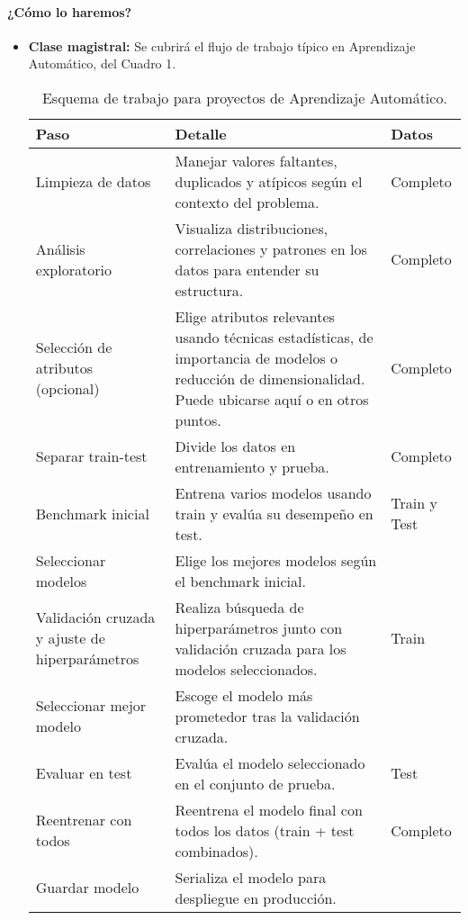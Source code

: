 \documentclass[a4,11pt]{aleph-notas}
\begin{document}
\paragraph{¿Cómo lo haremos?}  
\begin{itemize}[leftmargin=*]
    \item \textbf{Clase magistral:} Se cubrirá el flujo de trabajo típico en Aprendizaje Automático, del Cuadro 1.

    \begin{table}[h]
        \centering\small
        \begin{tabular}{p{4.5cm}p{8.5cm}l}
            \toprule
            \textbf{Paso} & \textbf{Detalle} & \textbf{Datos} \\ \midrule
            Limpieza de datos 
            & Manejar valores faltantes, duplicados y atípicos según el contexto del problema. 
            & Completo \\ \midrule
            Análisis exploratorio 
            & Visualiza distribuciones, correlaciones y patrones en los datos para entender su estructura. 
            & Completo \\ \midrule
            Selección de atributos (opcional) 
            & Elige atributos relevantes usando técnicas estadísticas, de importancia de modelos o reducción de dimensionalidad. Puede ubicarse aquí o en otros puntos. 
            & Completo \\ \midrule
            Separar train-test 
            & Divide los datos en entrenamiento y prueba. 
            & Completo \\ \midrule
            Benchmark inicial 
            & Entrena varios modelos usando train y evalúa su desempeño en test. 
            & Train y Test \\ \midrule
            Seleccionar modelos 
            & Elige los mejores modelos según el benchmark inicial. 
            &  \\ \midrule
            Validación cruzada y ajuste de hiperparámetros
            & Realiza búsqueda de hiperparámetros junto con validación cruzada para los modelos seleccionados. 
            & Train \\ \midrule
            Seleccionar mejor modelo 
            & Escoge el modelo más prometedor tras la validación cruzada. 
            &  \\ \midrule
            Evaluar en test 
            & Evalúa el modelo seleccionado en el conjunto de prueba. 
            & Test \\ \midrule
            Reentrenar con todos 
            & Reentrena el modelo final con todos los datos (train + test combinados). 
            & Completo \\ \midrule
            Guardar modelo 
            & Serializa el modelo para despliegue en producción. 
            &  \\ \bottomrule
        \end{tabular}
        \caption{Esquema de trabajo para proyectos de Aprendizaje Automático.}
    \end{table}
\end{itemize}
\end{document}

